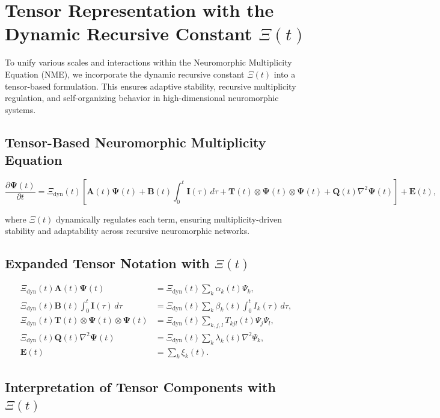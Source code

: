 \documentclass{article}
\theoremstyle{plain}
\begin{document}
\section{Tensor Representation with the Dynamic Recursive Constant \(\Xi(t) \)}

To unify various scales and interactions within the Neuromorphic Multiplicity Equation (NME), we incorporate the dynamic recursive constant \(\Xi(t) \) into a tensor-based formulation. This ensures adaptive stability, recursive multiplicity regulation, and self-organizing behavior in high-dimensional neuromorphic systems.

\subsection{Tensor-Based Neuromorphic Multiplicity Equation}

\begin{equation}
\frac{\partial \bm{\Psi}(t)}{\partial t} = \Xi_{\text{dyn}}(t) \left[ \bm{A}(t) \bm{\Psi}(t) + \bm{B}(t) \int_0^t \bm{I}(\tau) \, d\tau + \bm{T}(t) \otimes \bm{\Psi}(t) \otimes \bm{\Psi}(t) + \bm{Q}(t) \nabla^2 \bm{\Psi}(t) \right] + \bm{E}(t),
\end{equation}

where \(\Xi(t) \) dynamically regulates each term, ensuring multiplicity-driven stability and adaptability across recursive neuromorphic networks.

\subsection{Expanded Tensor Notation with \(\Xi(t) \)}

\begin{align}
\Xi_{\text{dyn}}(t) \bm{A}(t) \bm{\Psi}(t) &= \Xi_{\text{dyn}}(t) \sum_k \alpha_k(t) \Psi_k, \\
\Xi_{\text{dyn}}(t) \bm{B}(t) \int_0^t \bm{I}(\tau) \, d\tau &= \Xi_{\text{dyn}}(t) \sum_k \beta_k(t) \int_0^t I_k(\tau) \, d\tau, \\
\Xi_{\text{dyn}}(t) \bm{T}(t) \otimes \bm{\Psi}(t) \otimes \bm{\Psi}(t) &= \Xi_{\text{dyn}}(t) \sum_{k,j,l} T_{kjl}(t) \Psi_j \Psi_l, \\
\Xi_{\text{dyn}}(t) \bm{Q}(t) \nabla^2 \bm{\Psi}(t) &= \Xi_{\text{dyn}}(t) \sum_k \lambda_k(t) \nabla^2 \Psi_k, \\
\bm{E}(t) &= \sum_k \xi_k(t).
\end{align}

\subsection{Interpretation of Tensor Components with \(\Xi(t) \)}
\end{document}
